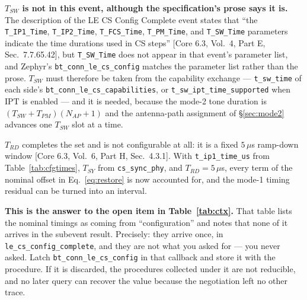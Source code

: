 \documentclass[11pt,a4paper]{article}
\newcommand{\us}{\,\ensuremath{\upmu}s}
\newcommand{\code}[1]{\texttt{\small #1}}
\newcommand{\IPT}{\ensuremath{\mathrm{IPT}}}
\newcommand{\Nap}{\ensuremath{N_{AP}}}
\providecommand{\upmu}{\mu}
\newcommand{\core}[1]{\textcolor{rulegrey}{\small[Core 6.3, #1]}}
\newcommand{\Tsy}{\ensuremath{T_{SY}}}
\newcommand{\Trd}{\ensuremath{T_{RD}}}
\newcommand{\Tpm}{\ensuremath{T_{PM}}}
\newcommand{\Tsw}{\ensuremath{T_{SW}}}
\begin{document}
\begin{caution}
\textbf{\Tsw{} is not in this event, although the specification's prose says it is.} The description
of the LE CS Config Complete event states that ``the \code{T\_\allowbreak{}IP1\_\allowbreak{}Time},
\code{T\_\allowbreak{}IP2\_\allowbreak{}Time}, \code{T\_\allowbreak{}FCS\_\allowbreak{}Time}, \code{T\_\allowbreak{}PM\_\allowbreak{}Time}, and
\code{T\_\allowbreak{}SW\_\allowbreak{}Time} parameters indicate the time durations used in CS steps''
\core{Vol.\ 4, Part E, Sec.\ 7.7.65.42}, but \code{T\_\allowbreak{}SW\_\allowbreak{}Time} does not appear in that
event's parameter list, and Zephyr's \code{bt\_\allowbreak{}conn\_\allowbreak{}le\_\allowbreak{}cs\_\allowbreak{}config} matches the parameter
list rather than the prose. \Tsw{} must therefore be taken from the capability exchange ---
\code{t\_\allowbreak{}sw\_\allowbreak{}time} of each side's \code{bt\_\allowbreak{}conn\_\allowbreak{}le\_\allowbreak{}cs\_\allowbreak{}capabilities}, or
\code{t\_\allowbreak{}sw\_\allowbreak{}ipt\_\allowbreak{}time\_\allowbreak{}supported} when \IPT{} is enabled --- and it is needed, because the
mode-2 tone duration is $(\Tsw+\Tpm)(\Nap+1)$ and the antenna-path assignment of \S\ref{sec:mode2}
advances one \Tsw{} slot at a time.
\end{caution}

\Trd{} completes the set and is not configurable at all: it is a fixed $5$\us{} ramp-down window
\core{Vol.\ 6, Part H, Sec.\ 4.3.1}. With \code{t\_\allowbreak{}ip1\_\allowbreak{}time\_\allowbreak{}us} from
Table~\ref{tab:cfgtimes}, \Tsy{} from \code{cs\_\allowbreak{}sync\_\allowbreak{}phy}, and $\Trd=5$\us, every term of the
nominal offset in Eq.~\eqref{eq:restore} is now accounted for, and the mode-1 timing residual can be
turned into an interval.

\begin{callout}
\textbf{This is the answer to the open item in Table~\ref{tab:ctx}.} That table lists the nominal
timings as coming from ``configuration'' and notes that none of it arrives in the subevent result.
Precisely: they arrive once, in \code{le\_\allowbreak{}cs\_\allowbreak{}config\_\allowbreak{}complete}, and they are not what
you asked for --- you never asked. Latch \code{bt\_\allowbreak{}conn\_\allowbreak{}le\_\allowbreak{}cs\_\allowbreak{}config} in that callback
and store it with the procedure. If it is discarded, the procedures collected under it are not
reducible, and no later query can recover the value because the negotiation left no other trace.
\end{callout}
\end{document}
